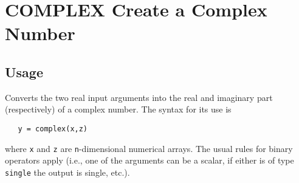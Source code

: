 \section{COMPLEX Create a Complex Number}

\subsection{Usage}

Converts the two real input arguments into the real and imaginary part
(respectively) of a complex number.  The syntax
for its use is
\begin{verbatim}
   y = complex(x,z)
\end{verbatim}
where \verb|x| and \verb|z| are \verb|n|-dimensional numerical arrays.  The usual rules
for binary operators apply (i.e., one of the arguments can be a scalar,
if either is of type \verb|single| the output is single, etc.).
